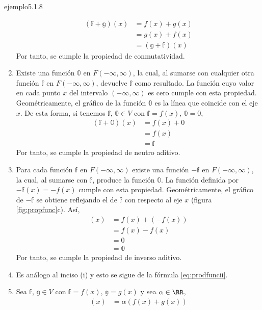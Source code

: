 \begin{examplebox}{}{ejemplo5.1.8}
\begin{enumerate}[label=\roman*), topsep=6pt, itemsep=0pt]
\begin{align*}
            (\mathbb{f} + \mathbb{g})(x) & = f(x) + g(x) \\
            & = g(x) + f(x) \\
            & = (\mathbb{g} + \mathbb{f})(x)
        \end{align*}
        Por tanto, se cumple la propiedad de conmutatividad.
        \item Existe una función $\mathbb{0}$ en $F(-\infty, \infty)$, la cual, al sumarse con cualquier otra función $\mathbb{f}$ en $F(-\infty, \infty)$, devuelve $\mathbb{f}$ como resultado. La función cuyo valor en cada punto $x$ del intervalo $(-\infty, \infty)$ es cero cumple con esta propiedad. Geométricamente, el gráfico de la función $\mathbb{0}$ es la línea que coincide con el eje $x$. De esta forma, si tenemos $\mathbb{f}$, $\mathbb{0} \in V$ con $\mathbb{f} = f(x)$, $\mathbb{0} = 0$,
        \begin{align*}
            (\mathbb{f} + \mathbb{0})(x) & = f(x) + 0 \\
            & = f(x) \\
            & = \mathbb{f}
        \end{align*}
        Por tanto, se cumple la propiedad de neutro aditivo.
        \item Para cada función $\mathbb{f}$ en $F(-\infty, \infty)$ existe una función $-\mathbb{f}$ en $F(-\infty, \infty)$, la cual, al sumarse con $\mathbb{f}$, produce la función $\mathbb{0}$. La función definida por $-\mathbb{f}(x) = -f(x)$ cumple con esta propiedad. Geométricamente, el gráfico de $-\mathbb{f}$ se obtiene reflejando el de $\mathbb{f}$ con respecto al eje $x$ (figura \ref{fig:propfunc}c). Así,
        \begin{align*}
            [\mathbb{f} + (-\mathbb{f})](x) & = f(x) + (-f(x)) \\
            & = f(x) - f(x) \\
            & = 0 \\
            & = \mathbb{0}
        \end{align*}
        Por tanto, se cumple la propiedad de inverso aditivo.
        \item Es análogo al inciso (i) y esto se sigue de la fórmula \eqref{eq:prodfuncii}.
        \item Sea $\mathbb{f}$, $\mathbb{g} \in V$ con $\mathbb{f} = f(x)$, $\mathbb{g} = g(x)$ y sea $\alpha \in \RR$,
        \begin{align*}
            [\alpha \cdot (\mathbb{f} + \mathbb{g})](x) & = \alpha (f(x) + g(x)) \\

\end{align*}
\end{enumerate}
\end{examplebox}
